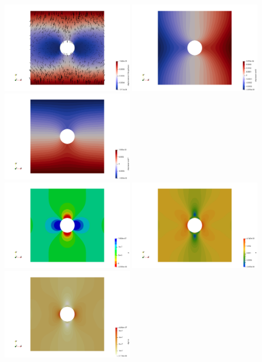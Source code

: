 \begin{center}
\includegraphics[width=5.6cm]{python_codes/fieldstone_124/results/exp1/disp}
\includegraphics[width=5.6cm]{python_codes/fieldstone_124/results/exp1/disp_x}
\includegraphics[width=5.6cm]{python_codes/fieldstone_124/results/exp1/disp_y}\\
\includegraphics[width=5.6cm]{python_codes/fieldstone_124/results/exp1/press}
\includegraphics[width=5.6cm]{python_codes/fieldstone_124/results/exp1/e}
\includegraphics[width=5.6cm]{python_codes/fieldstone_124/results/exp1/sigma}\\

\end{center}
